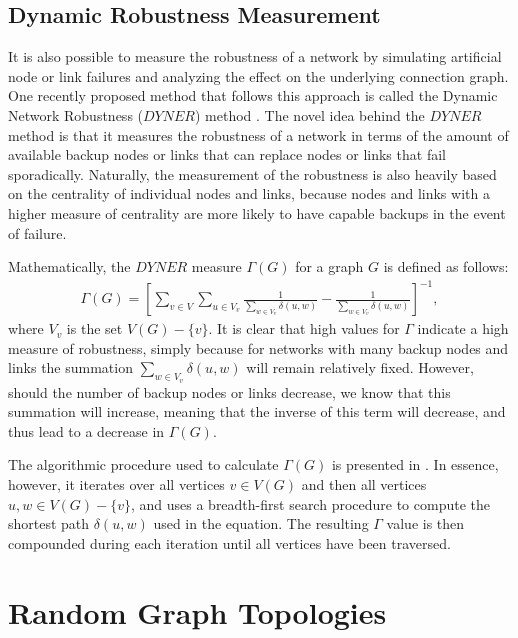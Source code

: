 \documentclass[doc]{apa}%
\begin{document}
\subsection{Dynamic Robustness Measurement}

It is also possible to measure the robustness of a network by simulating artificial node or link failures and analyzing the effect on the underlying connection graph. One recently proposed method that follows this approach is called the Dynamic Network Robustness ($DYNER$) method \cite{singerdynamic}. The novel idea behind the $DYNER$ method is that it measures the robustness of a network in terms of the amount of available backup nodes or links that can replace nodes or links that fail sporadically. Naturally, the measurement of the robustness is also heavily based on the centrality of individual nodes and links, because nodes and links with a higher measure of centrality are more likely to have capable backups in the event of failure. 

Mathematically, the $DYNER$ measure $\Gamma(G)$ for a graph $G$ is defined as follows:
\begin{eqnarray}
\Gamma(G) = \left[\sum_{v \in V}\sum_{u \in V_v}\frac{1}{\sum_{w \in V_v}\delta(u,w)} - \frac{1}{\sum_{w \in V_v}\delta(u,w)}\right]^{-1},
\end{eqnarray}
where $V_v$ is the set $V(G) - \{v\}$. It is clear that high values for $\Gamma$ indicate a high measure of robustness, simply because for networks with many backup nodes and links the summation $\sum_{w \in V_v}\delta(u,w)$ will remain relatively fixed. However, should the number of backup nodes or links decrease, we know that this summation will increase, meaning that the inverse of this term will decrease, and thus lead to a decrease in $\Gamma(G)$. 

The algorithmic procedure used to calculate $\Gamma(G)$ is presented in \cite{singerdynamic}. In essence, however, it iterates over all vertices $v \in V(G)$ and then all vertices $u, w \in V(G) - \{v\}$, and uses a breadth-first search procedure to compute the shortest path $\delta(u, w)$ used in the equation. The resulting $\Gamma$ value is then compounded during each iteration until all vertices have been traversed. 

\section{Random Graph Topologies}
\end{document}
